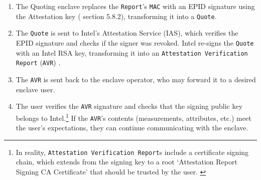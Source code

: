 \begin{enumerate}
    \item The Quoting enclave replaces the {\tt Report}'s {\tt MAC} with an EPID signature using the Attestation key (\cite{intel-sgx-explained-advanced} section 5.8.2), transforming it into a {\tt Quote}.
    \item The {\tt Quote} is sent to Intel's Attestation Service (IAS), which verifies the EPID signature and checks if the signer was revoked. Intel re-signs the {\tt Quote} with an Intel RSA key, transforming it into an {\tt Attestation Verification Report} ({\tt AVR}) \cite{sgx-attestation-service-api}.
    \item The {\tt AVR} is sent back to the enclave operator, who may forward it to a desired enclave user.
    \item The user verifies the {\tt AVR} signature and checks that the signing public key belongs to Intel.\footnote{In reality, {\tt Attestation Verification Report}s include a certificate signing chain, which extends from the signing key to a root `Attestation Report Signing CA Certificate' that should be trusted by the user. \cite{sgx-attestation-service-api}} If the {\tt AVR}'s contents (measurements, attributes, etc.) meet the user's expectations, they can continue communicating with the enclave.
\end{enumerate}




